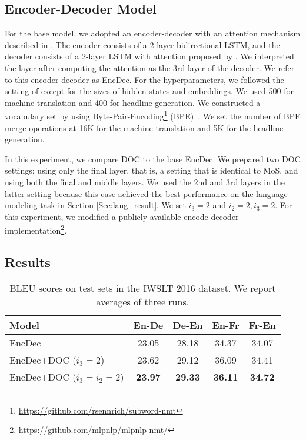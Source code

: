 \documentclass[11pt,a4paper]{article}
\begin{document}
\subsection{Encoder-Decoder Model}
For the base model, we adopted an encoder-decoder with an attention mechanism described in .
The encoder consists of a 2-layer bidirectional LSTM, and the decoder consists of a 2-layer LSTM with attention proposed by .
We interpreted the layer after computing the attention as the 3rd layer of the decoder.
We refer to this encoder-decoder as EncDec.
For the hyperparameters, we followed the setting of  except for the sizes of hidden states and embeddings.
We used 500 for machine translation and 400 for headline generation.
We constructed a vocabulary set by using Byte-Pair-Encoding\footnote{\href{https://github.com/rsennrich/subword-nmt}{https://github.com/rsennrich/subword-nmt}} (BPE)~\cite{sennrich-haddow-birch:2016:P16-11}.
We set the number of BPE merge operations at 16K for the machine translation and 5K for the headline generation.


In this experiment, we compare DOC to the base EncDec.
We prepared two DOC settings: using only the final layer, that is, a setting that is identical to MoS, and using both the final and middle layers.
We used the 2nd and 3rd layers in the latter setting because this case achieved the best performance on the language modeling task in Section \ref{Sec:lang_result}.
We set $i_{3} = 2$ and $i_{2} = 2, i_{3} = 2$.
For this experiment, we modified a publicly available encode-decoder implementation\footnote{\href{https://github.com/mlpnlp/mlpnlp-nmt/}{https://github.com/mlpnlp/mlpnlp-nmt/}}.


\subsection{Results}

\begin{table}[!t]
  \centering
  \small
  \tabcolsep=2.5pt
  \begin{tabular}{| l | c c c c |} \hline
  Model & En-De & De-En & En-Fr & Fr-En\\ \hline
  EncDec & 23.05 & 28.18 & 34.37 & 34.07 \\
  EncDec+DOC ($i_3 = 2$) & 23.62 & 29.12 & 36.09 & 34.41 \\
  EncDec+DOC ($i_3 = i_2 = 2$) & {\bf 23.97} & {\bf 29.33} & {\bf 36.11} & {\bf 34.72} \\ \hline
  \end{tabular}
  \caption{BLEU scores on test sets in the IWSLT 2016 dataset. We report averages of three runs.\label{tb:nmt}}
\end{table}
\end{document}
